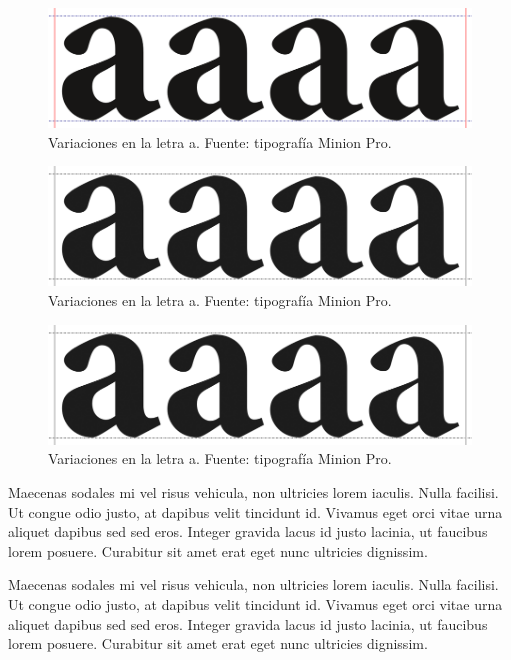 \ifPDF
\begin{figure}[!ht]
\centering
\includegraphics[width=\textwidth]{./media/letraA.png}
\caption{Variaciones en la letra a. Fuente: tipografía Minion Pro.}\label{figura1-1}
\end{figure}
	\else
	\ifBNPDF
	\begin{figure}[!ht]
	\centering
	\includegraphics[width=\textwidth]{./media/letraa.png}
	\caption{Variaciones en la letra a. Fuente: tipografía Minion Pro.}\label{figura1-1}
	\end{figure}
		\else
		\ifPNGEPUB
		\begin{figure}[!ht]
		\centering
		\includegraphics[width=\textwidth]{./media/letraa.png}
		\caption{Variaciones en la letra a. Fuente: tipografía Minion Pro.}\label{figura1-1}
		\end{figure}
		\fi
	\fi
\fi

Maecenas sodales mi vel risus vehicula, non ultricies lorem iaculis. Nulla facilisi. Ut congue odio justo, at dapibus velit tincidunt id. Vivamus eget orci vitae urna aliquet dapibus sed sed eros. Integer gravida lacus id justo lacinia, ut faucibus lorem posuere. Curabitur sit amet erat eget nunc ultricies dignissim.

Maecenas sodales mi vel risus vehicula, non ultricies lorem iaculis. Nulla facilisi. Ut congue odio justo, at dapibus velit tincidunt id. Vivamus eget orci vitae urna aliquet dapibus sed sed eros. Integer gravida lacus id justo lacinia, ut faucibus lorem posuere. Curabitur sit amet erat eget nunc ultricies dignissim.

